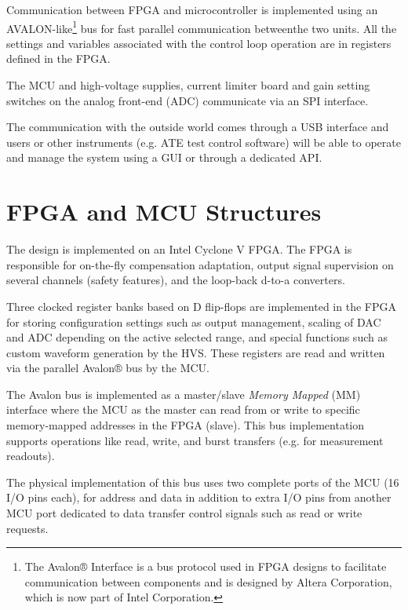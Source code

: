 Communication between FPGA and microcontroller is implemented using an
AVALON-like\footnote{
    The Avalon® Interface is a bus protocol used in FPGA designs to facilitate
    communication between components and is designed by Altera Corporation, which is
    now part of Intel Corporation.} bus for fast parallel communication betweenthe
two units.
All the settings and variables associated with the control loop operation are in
registers defined in the \ac{FPGA}.

The \ac{MCU} and high-voltage supplies, current limiter
board and gain setting switches on the analog front-end (\ac{ADC})
communicate via an \acs{SPI} interface.

The communication with the outside world comes through a \acs{USB} interface
and users or other instruments (e.g. \acs{ATE} test control software) will be
able to operate and manage the system using a \acs{GUI} or through a
dedicated \ac{API}.


\section{\acs{FPGA} and \acs{MCU} Structures}
\label{sec:fpga-mcu-structures}

The design is implemented on an Intel Cyclone V \ac{FPGA}.
The \ac{FPGA} is responsible for on-the-fly compensation adaptation,
output signal supervision on several channels (safety features), and the
loop-back d-to-a converters.

Three clocked register banks based on D flip-flops are implemented in the FPGA
for storing configuration settings such as output management,
scaling of \ac{DAC} and \ac{ADC} depending on the active selected range, and
special functions such as custom waveform generation by the \ac{HVS}.
These registers are read and written via the parallel Avalon® bus by
the MCU.

The Avalon bus is implemented as a master/slave \emph{Memory Mapped} (MM)
interface where the \ac{MCU} as the master can read from or write to specific
memory-mapped addresses in the \ac{FPGA} (slave).
This bus implementation supports operations like read, write, and
burst transfers (e.g. for measurement readouts).

The physical implementation of this bus uses two complete ports of the
\ac{MCU} (16 I/O pins each), for address and data in addition to extra I/O pins
from another \ac{MCU} port dedicated to data transfer control signals such as
read or write requests.

